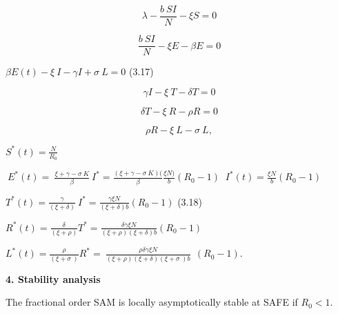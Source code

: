\documentclass[10pt]{NSP1}
\begin{document}
\par\vspace{14.0pt}\vspace{14.0pt}

\[
\lambda - \frac{b\ SI}{N} - \xi S = 0
\]

\[
\frac{b\ SI}{N} - \xi E - \beta E = 0
\]

\(\beta E(t) - \xi\ I - \gamma I + \sigma\ L = 0\) (3.17)

\[
\gamma I - \xi\ T - \delta T = 0
\]

\[
\delta T - \xi\ R - \rho R = 0
\]

\[
\rho R - \xi\ L - \sigma\ L,
\]

\par\vspace{14.0pt}\vspace{14.0pt}

\(S^{*}(t) = \frac{N}{R_{0}}\)

\(\ E^{*}(t) = \ \frac{\xi + \gamma - \sigma\ K}{\beta}{\ I}^{*} = \frac{(\xi + \gamma - \sigma\ K)(}{\beta}\frac{\xi N)}{b}(R_{0} - 1)\) \({\ I}^{*}(t) = \frac{\xi N}{b}(R_{0} - 1)\)

\(T^{*}(t) = \frac{\gamma}{(\xi + \delta)}{\ I}^{*} = \frac{\gamma\xi N}{(\xi + \delta)b}(R_{0} - 1)\) (3.18)

\(R^{*}(t) = \frac{\delta}{(\xi + \rho)}T^{*} = \frac{\delta\gamma\xi N}{(\xi + \rho)(\xi + \delta)b}(R_{0} - 1)\)

\(L^{*}(t) = \frac{\rho}{(\xi + \sigma\ )}R^{*} = \ \frac{\rho\delta\gamma\xi N}{(\xi + \rho)(\xi + \delta)(\xi + \sigma\ )b}\ \ (R_{0} - 1)\).

\par\vspace{14.0pt}\noindent \begin{center}\large\bfseries 4. Stability analysis\end{center}\vspace{14.0pt}

\par\medskip{}\smallskip

The fractional order SAM is locally asymptotically stable at SAFE if \(R_{0} < 1.\)

\par\vspace{14.0pt}\vspace{14.0pt}
\end{document}
